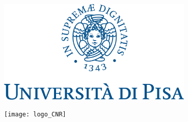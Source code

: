 \documentclass[a4paper,twoside,openright]{book}
\theoremstyle{plain}
\theoremstyle{definition}
\begin{document}

\begin{titlepage}
\centering



 { %
    \begin{minipage}[c]{0.49\textwidth}
    \raggedright
    \includegraphics[width=0.7\textwidth]{logo_UNIPI}    
    \end{minipage}
    \begin{minipage}[c]{0.49\textwidth}
    \raggedleft
    \texttt{[image: logo\_CNR]}
    \end{minipage}
} %


\end{titlepage}
\end{document}
